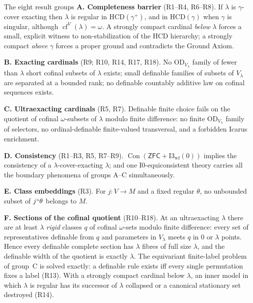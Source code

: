 \documentclass[11pt,letterpaper]{article}
\theoremstyle{definition}
\numberwithin{equation}{section}
\newcommand{\ZFC}{\mathsf{ZFC}}
\newcommand{\OD}{\mathrm{OD}}
\newcommand{\HCD}{\mathrm{HCD}}
\newcommand{\Con}{\operatorname{Con}}
\newcommand{\cf}{\operatorname{cf}}
\newcommand{\Izero}{\mathrm{I0}}
\newcommand{\Iwf}{\mathrm{I3}_{\mathrm{wf}}(0)}
\newcommand{\R}[1]{\textsf{R#1}}
\begin{document}
\begin{assessment}{The eight result groups}
\textbf{A. Completeness barrier} (\R1--\R4, \R6--\R8). If $\lambda$ is $\gamma$-cover exacting then $\lambda$ is regular in $\HCD(\gamma^+)$, and in $\HCD(\gamma)$ when $\gamma$ is singular, although $\cf^V(\lambda)=\omega$. A strongly compact cardinal \emph{below} $\lambda$ forces a small, explicit witness to non-stabilization of the $\HCD$ hierarchy; a strongly compact \emph{above} $\gamma$ forces a proper ground and contradicts the Ground Axiom.

\textbf{B. Exacting cardinals} (\R9; \R{10}, \R{14}, \R{17}, \R{18}). No $\OD_{V_\lambda}$ family of fewer than $\lambda$ short cofinal subsets of $\lambda$ exists; small definable families of subsets of $V_\lambda$ are separated at a bounded rank; no definable countably additive law on cofinal sequences exists.

\textbf{C. Ultraexacting cardinals} (\R5, \R7). Definable finite choice fails on the quotient of cofinal $\omega$-subsets of $\lambda$ modulo finite difference: no finite $\OD_{V_\lambda}$ family of selectors, no ordinal-definable finite-valued transversal, and a forbidden Icarus enrichment.

\textbf{D. Consistency} (\R1--\R3, \R5, \R7--\R9). $\Con(\ZFC+\Iwf)$ implies the consistency of a $\lambda$-cover-exacting $\lambda$; and one $\Izero$-equiconsistent theory carries all the boundary phenomena of groups A--C simultaneously.

\textbf{E. Class embeddings} (\R3). For $j:V\to M$ and a fixed regular $\theta$, no unbounded subset of $j``\theta$ belongs to $M$.

\textbf{F. Sections of the cofinal quotient} (\R{10}--\R{18}). At an ultraexacting $\lambda$ there are at least $\lambda$ \emph{rigid} classes $q$ of cofinal $\omega$-sets modulo finite difference: every set of representatives definable from $q$ and parameters in $V_\lambda$ meets $q$ in $0$ or $\lambda$ points. Hence every definable complete section has $\lambda$ fibres of full size $\lambda$, and the definable width of the quotient is exactly $\lambda$. The equivariant finite-label problem of group~C is solved exactly: a definable rule exists iff every single permutation fixes a label (\R{13}). With a strongly compact cardinal below $\lambda$, an inner model in which $\lambda$ is regular has its successor of $\lambda$ collapsed or a canonical stationary set destroyed (\R{14}).


\end{assessment}
\end{document}
